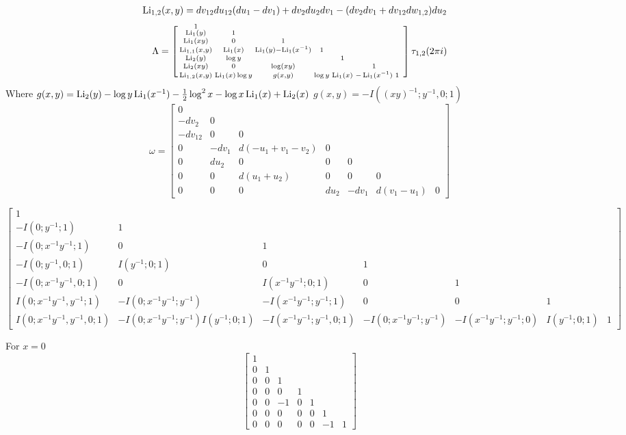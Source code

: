 \documentclass[main]{subfiles}
\begin{document}
\begin{align*}
\operatorname{Li}_{1,2}(x,y)&=dv_{12}du_{12}(du_1-dv_1)+dv_2du_2dv_1-(dv_2dv_1+dv_{12}dw_{1,2})du_2
\end{align*}
\[\Lambda=\left[\begin{smallmatrix}
1&&&&&&&\\
\operatorname{Li}_{1}(y)&1&&&&&\\
\operatorname{Li}_{1}(xy)&0&1&&&&\\
\operatorname{Li}_{1,1}(x,y)&\operatorname{Li}_1(x)&\operatorname{Li}_1(y)-\operatorname{Li}_1(x^{-1})&1&&&\\
\operatorname{Li}_2(y)&\log y&&&1&&&\\
\operatorname{Li}_{2}(xy)&0&\log(xy)&&&1&&\\
\operatorname{Li}_{1,2}(x,y)&\operatorname{Li}_1(x)\log y&g(x,y)&\log y&\operatorname{Li}_1(x)&-\operatorname{Li}_1(x^{-1})&1
\end{smallmatrix}\right]\tau_{1,2}(2\pi i)\]
Where $g(x,y)=\operatorname{Li}_2(y)-\log y\operatorname{Li}_1(x^{-1})-\frac{1}{2}\log^2x-\log x\operatorname{Li}_1(x)+\operatorname{Li}_2(x)$
$g(x,y)=-I((xy)^{-1};y^{-1},0;1)$
\[\omega=\begin{bmatrix}
0&&&&&&\\
-dv_2&0&&&&&\\
-dv_{12}&0&0&&&\\
0&-dv_1&d(-u_1+v_1-v_2)&0&&&\\
0&du_2&0&0&0&&\\
0&0&d(u_1+u_2)&0&0&0&\\
0&0&0&du_2&-dv_1&d(v_1-u_1)&0
\end{bmatrix}\]

\[
\left[\begin{smallmatrix}
1 \\
-I(0;y^{-1};1) & 1 \\
-I(0;x^{-1}y^{-1};1) & 0 & 1 \\
-I(0;y^{-1},0;1) & I(y^{-1};0;1) & 0 & 1 \\
-I(0;x^{-1}y^{-1},0;1) & 0 & I(x^{-1}y^{-1};0;1) & 0 & 1 \\
I(0;x^{-1}y^{-1},y^{-1};1) & -I(0;x^{-1}y^{-1};y^{-1}) & -I(x^{-1}y^{-1};y^{-1};1) & 0 & 0 & 1 \\
I(0;x^{-1}y^{-1},y^{-1},0;1) & -I(0;x^{-1}y^{-1};y^{-1})I(y^{-1};0;1) & -I(x^{-1}y^{-1};y^{-1},0;1) & -I(0;x^{-1}y^{-1};y^{-1}) & -I(x^{-1}y^{-1};y^{-1};0) & I(y^{-1};0;1) & 1
\end{smallmatrix}\right]
\]

For $x=0$
\[
\begin{bmatrix}
1 \\
0&1 \\
0&0&1 \\
0&0&0&1 \\
0&0&-1&0&1 \\
0&0&0&0&0&1 \\
0&0&0&0&0&-1&1
\end{bmatrix}
\]
\end{document}
